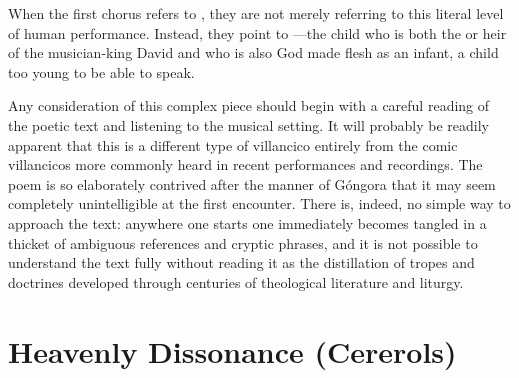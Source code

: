 When the first chorus refers to , they are not merely
referring to this literal level of human performance.
Instead, they point to ---the child who is both
the  or heir of the musician-king David and who is also God made
flesh as an infant, a child too young to be able to speak.

Any consideration of this complex piece should begin with a careful reading of
the poetic text and listening to the musical setting.%
    \autocite[\XXX]{Cashner:SingingAboutSingingI}
It will probably be readily apparent that this is a different type of
villancico entirely from the comic villancicos more commonly heard in recent
performances and recordings.
The poem is so elaborately contrived after the manner of Góngora that it may
seem completely unintelligible at the first encounter. 
There is, indeed, no simple way to approach the text: anywhere one starts one
immediately becomes tangled in a thicket of ambiguous references and cryptic
phrases, and it is not possible to understand the text fully without reading it
as the distillation of tropes and doctrines developed through centuries of
theological literature and liturgy.








\section{Heavenly Dissonance (Cererols)}


